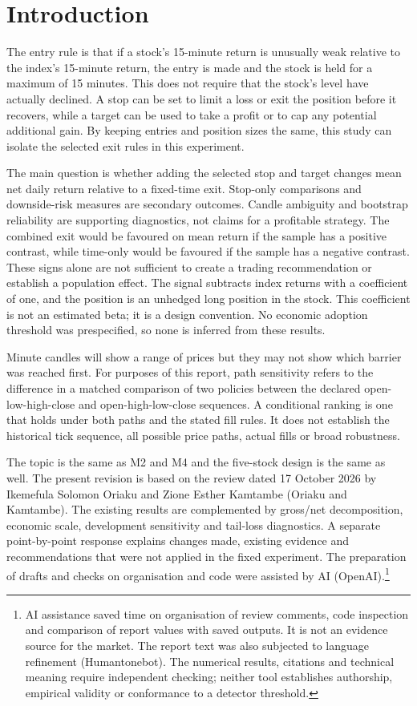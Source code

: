 \documentclass[11pt,a4paper]{article}
\begin{document}
\section*{Introduction}

The entry rule is that if a stock's 15-minute return is unusually weak relative to the index's 15-minute return, the entry is made and the stock is held for a maximum of 15 minutes. This does not require that the stock's level have actually declined. A stop can be set to limit a loss or exit the position before it recovers, while a target can be used to take a profit or to cap any potential additional gain. By keeping entries and position sizes the same, this study can isolate the selected exit rules in this experiment.

The main question is whether adding the selected stop and target changes mean net daily return relative to a fixed-time exit. Stop-only comparisons and downside-risk measures are secondary outcomes. Candle ambiguity and bootstrap reliability are supporting diagnostics, not claims for a profitable strategy. The combined exit would be favoured on mean return if the sample has a positive contrast, while time-only would be favoured if the sample has a negative contrast. These signs alone are not sufficient to create a trading recommendation or establish a population effect. The signal subtracts index returns with a coefficient of one, and the position is an unhedged long position in the stock. This coefficient is not an estimated beta; it is a design convention. No economic adoption threshold was prespecified, so none is inferred from these results.

Minute candles will show a range of prices but they may not show which barrier was reached first. For purposes of this report, path sensitivity refers to the difference in a matched comparison of two policies between the declared open-low-high-close and open-high-low-close sequences. A conditional ranking is one that holds under both paths and the stated fill rules. It does not establish the historical tick sequence, all possible price paths, actual fills or broad robustness.

The topic is the same as M2 and M4 and the five-stock design is the same as well. The present revision is based on the review dated 17 October 2026 by Ikemefula Solomon Oriaku and Zione Esther Kamtambe (Oriaku and Kamtambe). The existing results are complemented by gross/net decomposition, economic scale, development sensitivity and tail-loss diagnostics. A separate point-by-point response explains changes made, existing evidence and recommendations that were not applied in the fixed experiment. The preparation of drafts and checks on organisation and code were assisted by AI (OpenAI).\footnote{AI assistance saved time on organisation of review comments, code inspection and comparison of report values with saved outputs. It is not an evidence source for the market. The report text was also subjected to language refinement (Humantonebot). The numerical results, citations and technical meaning require independent checking; neither tool establishes authorship, empirical validity or conformance to a detector threshold.}
\end{document}
